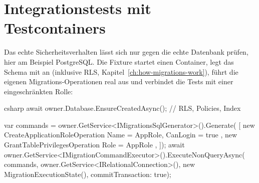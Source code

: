 \section{Integrationstests mit Testcontainers}

Das echte Sicherheitsverhalten lässt sich nur gegen die echte Datenbank prüfen, hier am Beispiel
PostgreSQL. Die Fixture startet
einen Container, legt das Schema mit  an (inklusive RLS,
Kapitel~\ref{ch:how-migrations-work}), führt die eigenen Migrations-Operationen real aus und
verbindet die Tests mit einer eingeschränkten Rolle:

\begin{sourcecode}{csharp}
await owner.Database.EnsureCreatedAsync();          // RLS, Policies, Index

var commands = owner.GetService<IMigrationsSqlGenerator>().Generate(
[
    new CreateApplicationRoleOperation { Name = AppRole, CanLogin = true },
    new GrantTablePrivilegesOperation { Role = AppRole },
]);
await owner.GetService<IMigrationCommandExecutor>().ExecuteNonQueryAsync(
    commands, owner.GetService<IRelationalConnection>(),
    new MigrationExecutionState(), commitTransaction: true);
\end{sourcecode}


